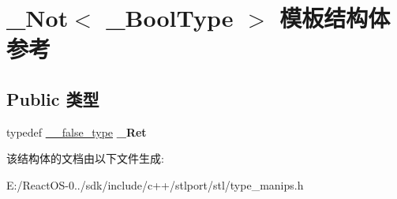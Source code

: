 \hypertarget{struct___not}{}\section{\+\_\+\+Not$<$ \+\_\+\+Bool\+Type $>$ 模板结构体 参考}
\label{struct___not}
\subsection*{Public 类型}
\begin{DoxyCompactItemize}
\item 
\mbox{\label{struct___not_aea31a18eec6dd3c7fc7d348af4d12ae1}} 
typedef \hyperlink{struct____false__type}{\+\_\+\+\_\+false\+\_\+type} {\bfseries \+\_\+\+Ret}
\end{DoxyCompactItemize}


该结构体的文档由以下文件生成\+:\begin{DoxyCompactItemize}
\item 
E\+:/\+React\+O\+S-\/0../sdk/include/c++/stlport/stl/type\+\_\+manips.\+h\end{DoxyCompactItemize}
